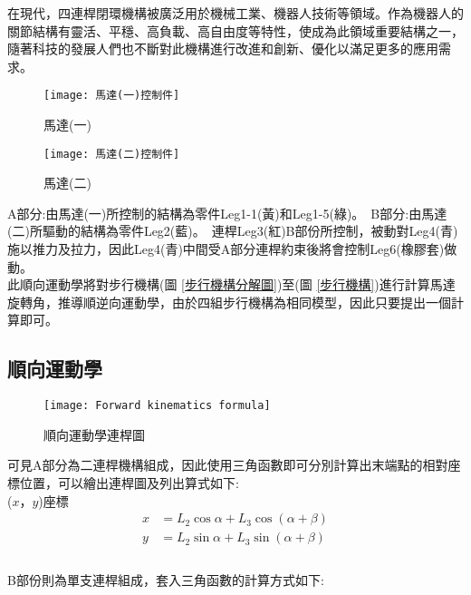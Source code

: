 在現代，四連桿閉環機構被廣泛用於機械工業、機器人技術等領域。作為機器人的關節結構有靈活、平穩、高負載、高自由度等特性，使成為此領域重要結構之一，隨著科技的發展人們也不斷對此機構進行改進和創新、優化以滿足更多的應用需求。\
\begin{figure}[htbp]
  \begin{minipage}[t]{0.5\linewidth}
    \centering
    \texttt{[image: 馬達(一)控制件]}
    \caption{馬達(一)}
    \label{馬達(一)控制件}
  \end{minipage}
  \hfill
  \begin{minipage}[t]{0.4\linewidth}
    \centering
    \texttt{[image: 馬達(二)控制件]}
    \caption{馬達(二)}
    \label{馬達(二)控制件}
  \end{minipage}
\end{figure}
A部分:由馬達(一)所控制的結構為零件Leg1-1(黃)和Leg1-5(綠)。\
B部分:由馬達(二)所驅動的結構為零件Leg2(藍)。\
連桿Leg3(紅)B部份所控制，被動對Leg4(青)施以推力及拉力，因此Leg4(青)中間受A部分連桿約束後將會控制Leg6(橡膠套)做動。\\
此順向運動學將對步行機構(圖 \ref{步行機構分解圖})至(圖 \ref{步行機構})進行計算馬達旋轉角，推導順逆向運動學，由於四組步行機構為相同模型，因此只要提出一個計算即可。
\newpage

\subsection{順向運動學}

\begin{figure}[hbt!]
\begin{center}
\texttt{[image: Forward kinematics formula]}
\caption{\Large 順向運動學連桿圖}\label{Forward kinematics formula}
\end{center}
\end{figure}

可見A部分為二連桿機構組成，因此使用三角函數即可分別計算出末端點的相對座標位置，可以繪出連桿圖及列出算式如下:\\

($x$，$y$)座標
\[
\begin{aligned}
x&=L_{2}\cos \alpha +L_{3}\cos \left( \alpha +\beta \right)\\
y&=L_{2}\sin \alpha +L_{3}\sin \left( \alpha +\beta \right)\\
\end{aligned}
\]\\

B部份則為單支連桿組成，套入三角函數的計算方式如下:\\

